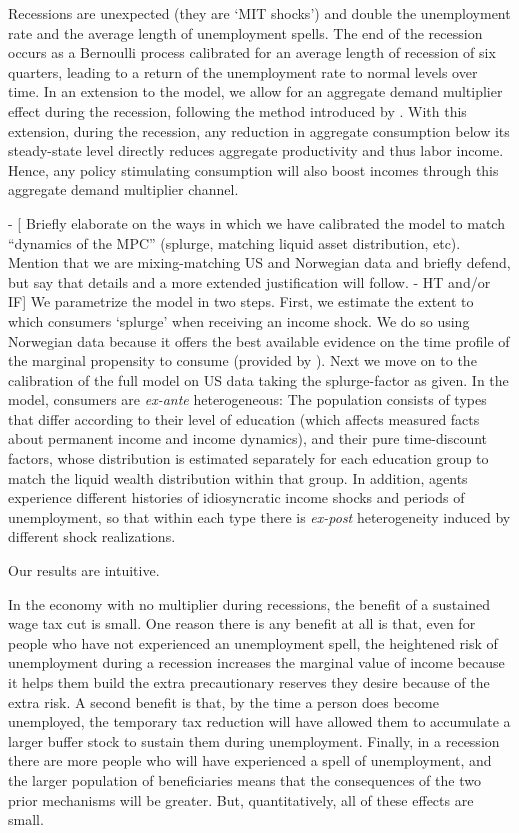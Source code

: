 \documentclass[../HAFiscal]{subfiles}
\begin{document}
Recessions are unexpected (they are `MIT shocks') and double the unemployment rate and the average length of unemployment spells. The end of the recession occurs as a Bernoulli process calibrated for an average length of recession of six quarters, leading to a return of the unemployment rate to normal levels over time. In an extension to the model, we allow for an aggregate demand multiplier effect during the recession, following the method introduced by \cite{kmpHandbook2016}. With this extension, during the recession, any reduction in aggregate consumption below its steady-state level directly reduces aggregate productivity and thus labor income. Hence, any policy stimulating consumption will also boost incomes through this aggregate demand multiplier channel.

- [ Briefly elaborate on the ways in which we have calibrated the model to match ``dynamics of the MPC'' (splurge, matching liquid asset distribution, etc).  Mention that we are mixing-matching US and Norwegian data and briefly defend, but say that details and a more extended justification will follow. - HT and/or IF]
We parametrize the model in two steps.  First, we estimate the extent to which consumers `splurge' when receiving an income shock. We do so using Norwegian data because it offers the best available evidence on the time profile of the marginal propensity to consume (provided by \citet{fagereng_mpc_2021}). Next we move on to the calibration of the full model on US data taking the splurge-factor as given. In the model, consumers are \textit{ex-ante} heterogeneous: The population consists of types that differ according to their level of education (which affects measured facts about permanent income and income dynamics), and their pure time-discount factors, whose distribution is estimated separately for each education group to match the liquid wealth distribution within that group. In addition, agents experience different histories of idiosyncratic income shocks and periods of unemployment, so that within each type there is \textit{ex-post} heterogeneity induced by different shock realizations. 

Our results are intuitive.

In the economy with no multiplier during recessions, the benefit of a sustained wage tax cut is small.  One reason there is any benefit at all is that, even for people who have not experienced an unemployment spell, the heightened risk of unemployment during a recession increases the marginal value of income because it helps them build the extra precautionary reserves they desire because of the extra risk.  A second benefit is that, by the time a person does become unemployed, the temporary tax reduction will have allowed them to accumulate a larger buffer stock to sustain them during unemployment.  Finally, in a recession there are more people who will have experienced a spell of unemployment, and the larger population of beneficiaries means that the consequences of the two prior mechanisms will be greater.  But, quantitatively, all of these effects are small.
\end{document}
